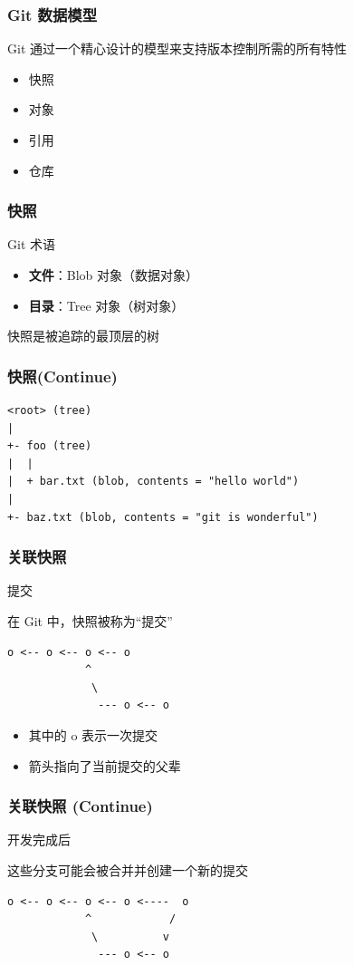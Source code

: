 \documentclass[UTF8, 16pt]{beamer}
\begin{document}
\begin{frame}
    \frametitle{Git 数据模型}
    \textcolor{sufered}{Git 通过一个精心设计的模型来支持版本控制所需的所有特性}
    \begin{itemize}
        \item 快照
        \item 对象
        \item 引用
        \item 仓库
    \end{itemize}
\end{frame}

\begin{frame}
    \frametitle{快照}
    \textcolor{sufered}{Git 术语}
    \begin{itemize}
        \item \textbf{文件}：Blob 对象（数据对象）
        \item \textbf{目录}：Tree 对象（树对象）
    \end{itemize}

    \textcolor{sufered}{快照是被追踪的最顶层的树}
\end{frame}

\begin{frame}[fragile]
    \frametitle{快照(Continue)}
    \begin{lstlisting}
<root> (tree)
|
+- foo (tree)
|  |
|  + bar.txt (blob, contents = "hello world")
|
+- baz.txt (blob, contents = "git is wonderful")
    \end{lstlisting}
\end{frame}

\begin{frame}[fragile]
    \frametitle{关联快照}
    \textcolor{sufered}{提交}

    在 Git 中，快照被称为“提交”

    \begin{lstlisting}
o <-- o <-- o <-- o
            ^
             \
              --- o <-- o
    \end{lstlisting}

    \begin{itemize}
        \item 其中的 o 表示一次提交
        \item 箭头指向了当前提交的父辈
    \end{itemize}

\end{frame}

\begin{frame}[fragile]
    \frametitle{关联快照 (Continue)}

    \textcolor{sufered}{开发完成后}

    这些分支可能会被合并并创建一个新的提交

    \begin{lstlisting}
o <-- o <-- o <-- o <----  o 
            ^            /
             \          v
              --- o <-- o
    \end{lstlisting}
\end{frame}
\end{document}
